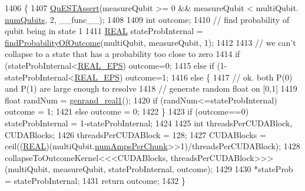 \begin{DoxyCode}
1406                                                                               \{
1407     \mbox{\hyperlink{QuEST__env__localGPU_8cu_a3587b9d533e633ccf1abf9ad2ce45d8d}{QuESTAssert}}(measureQubit >= 0 && measureQubit < multiQubit.
      \mbox{\hyperlink{structMultiQubit_ab5b9795bdc6fb5855e1974dcbbaeb36f}{numQubits}}, 2, \_\_func\_\_);
1408 
1409     \textcolor{keywordtype}{int} outcome;
1410     \textcolor{comment}{// find probability of qubit being in state 1}
1411     \mbox{\hyperlink{QuEST__precision_8h_a4b654506f18b8bfd61ad2a29a7e38c25}{REAL}} stateProbInternal = \mbox{\hyperlink{QuEST__env__localGPU_8cu_ad315c941a51bc053d39ebfa2040fd32e}{findProbabilityOfOutcome}}(multiQubit, measureQubit,
       1);
1412 
1413     \textcolor{comment}{// we can't collapse to a state that has a probability too close to zero}
1414     \textcolor{keywordflow}{if} (stateProbInternal<\mbox{\hyperlink{QuEST__precision_8h_aebb5e6716e06431296af4d1a71744dec}{REAL\_EPS}}) outcome=0;
1415     \textcolor{keywordflow}{else} \textcolor{keywordflow}{if} (1-stateProbInternal<\mbox{\hyperlink{QuEST__precision_8h_aebb5e6716e06431296af4d1a71744dec}{REAL\_EPS}}) outcome=1;
1416     \textcolor{keywordflow}{else} \{
1417         \textcolor{comment}{// ok. both P(0) and P(1) are large enough to resolve}
1418         \textcolor{comment}{// generate random float on [0,1]}
1419         \textcolor{keywordtype}{float} randNum = \mbox{\hyperlink{mt19937ar_8c_ac94ab75771800274ed1a2bedeca86f04}{genrand\_real1}}();
1420         \textcolor{keywordflow}{if} (randNum<=stateProbInternal) outcome = 1;
1421         \textcolor{keywordflow}{else} outcome = 0;
1422     \} 
1423     \textcolor{keywordflow}{if} (outcome==0) stateProbInternal = 1-stateProbInternal;
1424 
1425     \textcolor{keywordtype}{int} threadsPerCUDABlock, CUDABlocks;
1426     threadsPerCUDABlock = 128;
1427     CUDABlocks = ceil((\mbox{\hyperlink{QuEST__precision_8h_a4b654506f18b8bfd61ad2a29a7e38c25}{REAL}})(multiQubit.\mbox{\hyperlink{structMultiQubit_a1cad83601a78635dd278259c7ed54f18}{numAmpsPerChunk}}>>1)/threadsPerCUDABlock);
1428     collapseToOutcomeKernel<<<CUDABlocks, threadsPerCUDABlock>>>(multiQubit, measureQubit, 
      stateProbInternal, outcome);
1429 
1430     *stateProb = stateProbInternal;
1431     \textcolor{keywordflow}{return} outcome;
1432 \}
\end{DoxyCode}
\mbox{\label{QuEST__env__localGPU_8cu_afc1835c6b43b6e59ce7df7b13f274fc7}} 
